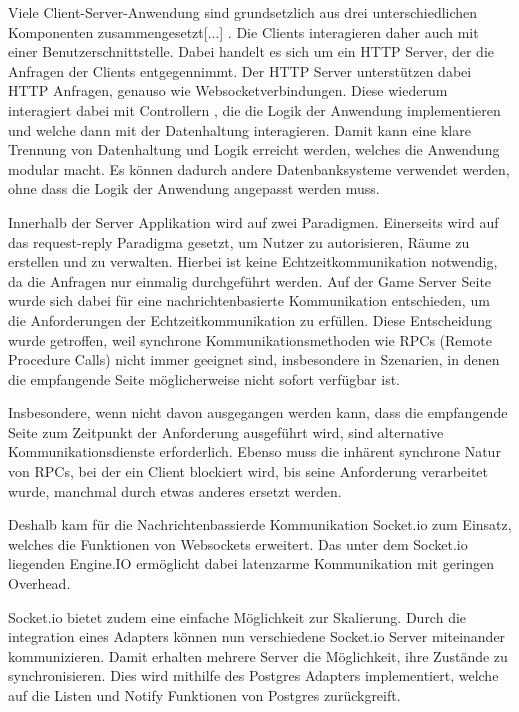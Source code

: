 \documentclass[
]{article}
\begin{document}
\glqq Viele Client-Server-Anwendung sind grundsetzlich aus drei unterschiedlichen Komponenten zusammengesetzt[...]\grqq{} \cite[S.57 ff.]{tanenbaum2007distributed}.
Die Clients interagieren daher auch mit einer Benutzerschnittstelle. Dabei handelt es sich um ein HTTP Server, der die Anfragen der Clients entgegennimmt.
Der HTTP Server unterstützen dabei HTTP Anfragen, genauso wie Websocketverbindungen.
Diese wiederum interagiert dabei mit \glqq Controllern \grqq{}, die die Logik der Anwendung implementieren und welche dann
mit der Datenhaltung interagieren. Damit kann eine klare Trennung von Datenhaltung und Logik erreicht werden, welches die Anwendung
modular macht. Es können dadurch andere Datenbanksysteme verwendet werden, ohne dass die Logik der Anwendung angepasst werden muss.

Innerhalb der Server Applikation wird auf zwei Paradigmen.
Einerseits wird auf das request-reply Paradigma gesetzt, um Nutzer zu autorisieren, Räume zu erstellen und zu verwalten.
Hierbei ist keine Echtzeitkommunikation notwendig, da die Anfragen nur einmalig durchgeführt werden.
Auf der Game Server Seite wurde sich dabei für eine nachrichtenbasierte Kommunikation entschieden, 
um die Anforderungen der Echtzeitkommunikation zu erfüllen. Diese Entscheidung wurde getroffen, 
weil synchrone Kommunikationsmethoden wie RPCs (Remote Procedure Calls) nicht immer geeignet 
sind, insbesondere in Szenarien, in denen die empfangende Seite möglicherweise nicht sofort 
verfügbar ist. 

\glqq Insbesondere, wenn nicht davon ausgegangen werden kann, 
dass die empfangende Seite zum Zeitpunkt der Anforderung ausgeführt wird, 
sind alternative Kommunikationsdienste erforderlich. 
Ebenso muss die inhärent synchrone Natur von RPCs, 
bei der ein Client blockiert wird, bis seine Anforderung verarbeitet wurde, 
manchmal durch etwas anderes ersetzt werden.\grqq{} \cite[S. 140 ff.]{tanenbaum2007distributed}

Deshalb kam für die Nachrichtenbassierde Kommunikation Socket.io zum Einsatz,
welches die Funktionen von Websockets erweitert.
Das unter dem Socket.io liegenden Engine.IO ermöglicht dabei latenzarme Kommunikation
mit geringen Overhead.\cite[]{engine-io-protocol}

Socket.io bietet zudem eine einfache Möglichkeit zur Skalierung. Durch die integration
eines Adapters können nun verschiedene Socket.io Server miteinander kommunizieren.
Damit erhalten mehrere Server die Möglichkeit, ihre Zustände zu synchronisieren.
Dies wird mithilfe des Postgres Adapters implementiert, welche auf die Listen und Notify
Funktionen von Postgres zurückgreift. \cite[]{postgres-adapter}
\end{document}
